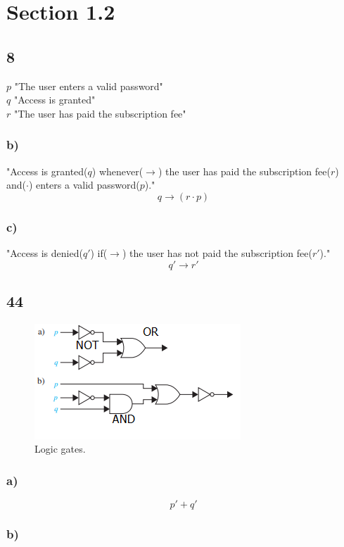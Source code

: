 \documentclass[journal]{IEEEtran}
\begin{document}
\section*{Section 1.2}
	\subsection*{8 }
	$p$  "The user enters a valid password" \\
	$q$  "Access is granted" \\
	$r$  "The user has paid the subscription fee" 
		
	\subsubsection*{b) }
	"Access is granted($q$) whenever($\rightarrow$) the user has paid the subscription fee($r$) 
	and($\cdot$) enters a valid password($p$)."
		$$\boxed{q \rightarrow (r \cdot p)}$$

	\subsubsection*{c) }
		"Access is denied($q'$) if($\rightarrow$) the user has not paid the subscription fee($r'$)."
		$$\boxed{q' \rightarrow r'}$$

		\subsection*{44 }

		\begin{figure}[H]
			\includegraphics[scale = 0.55]{LG.PNG}
			\caption{Logic gates.}
		\end{figure}

	\subsubsection*{a) }

		$$\boxed{p'+q'}$$

	\subsubsection*{b) }
\end{document}
